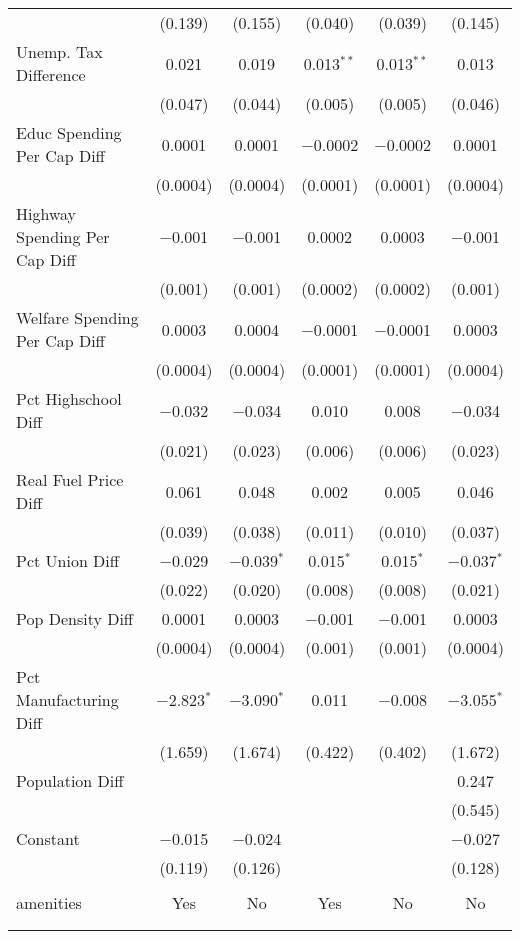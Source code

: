 \begin{table}[!htbp]
\begin{tabular}{@{\extracolsep{5pt}}lccccc}
  & (0.139) & (0.155) & (0.040) & (0.039) & (0.145) \\ 
  Unemp. Tax Difference & 0.021 & 0.019 & 0.013$^{**}$ & 0.013$^{**}$ & 0.013 \\ 
  & (0.047) & (0.044) & (0.005) & (0.005) & (0.046) \\ 
  Educ Spending Per Cap Diff & 0.0001 & 0.0001 & $-$0.0002 & $-$0.0002 & 0.0001 \\ 
  & (0.0004) & (0.0004) & (0.0001) & (0.0001) & (0.0004) \\ 
  Highway Spending Per Cap Diff & $-$0.001 & $-$0.001 & 0.0002 & 0.0003 & $-$0.001 \\ 
  & (0.001) & (0.001) & (0.0002) & (0.0002) & (0.001) \\ 
  Welfare Spending Per Cap Diff & 0.0003 & 0.0004 & $-$0.0001 & $-$0.0001 & 0.0003 \\ 
  & (0.0004) & (0.0004) & (0.0001) & (0.0001) & (0.0004) \\ 
  Pct Highschool Diff & $-$0.032 & $-$0.034 & 0.010 & 0.008 & $-$0.034 \\ 
  & (0.021) & (0.023) & (0.006) & (0.006) & (0.023) \\ 
  Real Fuel Price Diff & 0.061 & 0.048 & 0.002 & 0.005 & 0.046 \\ 
  & (0.039) & (0.038) & (0.011) & (0.010) & (0.037) \\ 
  Pct Union Diff & $-$0.029 & $-$0.039$^{*}$ & 0.015$^{*}$ & 0.015$^{*}$ & $-$0.037$^{*}$ \\ 
  & (0.022) & (0.020) & (0.008) & (0.008) & (0.021) \\ 
  Pop Density Diff & 0.0001 & 0.0003 & $-$0.001 & $-$0.001 & 0.0003 \\ 
  & (0.0004) & (0.0004) & (0.001) & (0.001) & (0.0004) \\ 
  Pct Manufacturing Diff & $-$2.823$^{*}$ & $-$3.090$^{*}$ & 0.011 & $-$0.008 & $-$3.055$^{*}$ \\ 
  & (1.659) & (1.674) & (0.422) & (0.402) & (1.672) \\ 
  Population Diff &  &  &  &  & 0.247 \\ 
  &  &  &  &  & (0.545) \\ 
  Constant & $-$0.015 & $-$0.024 &  &  & $-$0.027 \\ 
  & (0.119) & (0.126) &  &  & (0.128) \\ 
 \hline \\[-1.8ex] 
amenities & Yes & No & Yes & No & No \\ 
\hline \\[-1.8ex] 
\hline 
\hline \\[-1.8ex] 
\end{tabular} 
\end{table} 
